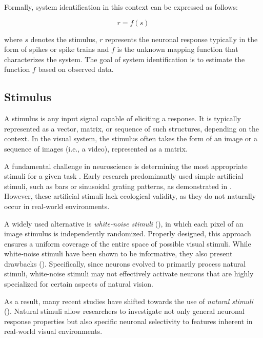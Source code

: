 Formally, system identification in this context can be expressed as follows:

\begin{equation}
    r = f(s)
\end{equation}
\label{eq:system_identification}

where $s$ denotes the stimulus, $r$ represents the neuronal response typically in the form of spikes or spike trains and $f$ is the unknown mapping function that characterizes the system. The goal of system identification is to estimate the function $f$ based on observed data.

\subsection{Stimulus}
\label{subsec:stimulus}

A stimulus is any input signal capable of eliciting a response. It is typically represented as a vector, matrix, or sequence of such structures, depending on the context. In the visual system, the stimulus often takes the form of an image or a sequence of images (i.e., a video), represented as a matrix.

A fundamental challenge in neuroscience is determining the most appropriate stimuli for a given task \citep{Carandini10577}. Early research predominantly used simple artificial stimuli, such as bars or sinusoidal grating patterns, as demonstrated in \citet{hubel1965receptive}. However, these artificial stimuli lack ecological validity, as they do not naturally occur in real-world environments.

A widely used alternative is \emph{white-noise stimuli} (\citet{dayan2005theoretical, chichilnisky2001simple}), in which each pixel of an image stimulus is independently randomized. Properly designed, this approach ensures a uniform coverage of the entire space of possible visual stimuli. While white-noise stimuli have been shown to be informative, they also present drawbacks (\citet{Talebi1560}). Specifically, since neurons evolved to primarily process natural stimuli, white-noise stimuli may not effectively activate neurons that are highly specialized for certain aspects of natural vision.

As a result, many recent studies have shifted towards the use of \emph{natural stimuli} (\citet{sonkusare2019naturalistic, lurz2020generalization, antolik2024comprehensive}). Natural stimuli allow researchers to investigate not only general neuronal response properties but also specific neuronal selectivity to features inherent in real-world visual environments.

